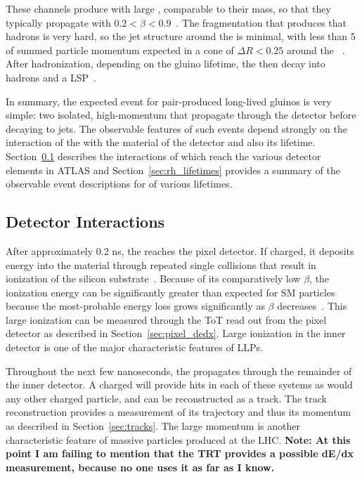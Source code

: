 These channels produce \rhadrons with large \pt, comparable to their mass, so that they typically propagate with $0.2 < \beta < 0.9$~\cite{rhad_atlas}.
The fragmentation that produces that hadrons is very hard, so the jet structure around the \rhadron is minimal, with less than 5 \GeV of summed particle momentum expected in a cone of $\Delta R < 0.25$ around the \rhadron~\cite{rhad_atlas}.
After hadronization, depending on the gluino lifetime, the \rhadrons then decay into hadrons and a \ac{LSP}~\cite{rhadron}.

In summary, the expected event for pair-produced long-lived gluinos is very simple: two isolated, high-momentum \rhadrons that propagate through the detector before decaying to jets.
The observable features of such events depend strongly on the interaction of the \rhadron with the material of the detector and also its lifetime.
Section~\ref{sec:rh_interactions} describes the interactions of \rhadrons which reach the various detector elements in \ac{ATLAS} and Section~\ref{sec:rh_lifetimes} provides a summary of the observable event descriptions for \rhadrons of various lifetimes.

\subsection{Detector Interactions}
\label{sec:rh_interactions}

After approximately 0.2 ns, the \rhadron reaches the pixel detector. If charged, it deposits energy into the material through repeated single collisions that result in ionization of the silicon substrate~\cite{pdg}. 
Because of its comparatively low $\beta$, the ionization energy can be significantly greater than expected for \ac{SM} particles because the most-probable energy loss grows significantly as $\beta$ decreases~\cite{pdg}.
This large ionization can be measured through the \ac{ToT} read out from the pixel detector as described in Section~\ref{sec:pixel_dedx}.
Large ionization in the inner detector is one of the major characteristic features of \acp{LLP}.

Throughout the next few nanoseconds, the \rhadron propagates through the remainder of the inner detector.
A charged \rhadron will provide hits in each of these systems as would any other charged particle, and can be reconstructed as a track.
The track reconstruction provides a measurement of its trajectory and thus its momentum as described in Section~\ref{sec:tracks}.
The large momentum is another characteristic feature of massive particles produced at the \ac{LHC}.
\textbf{Note: At this point I am failing to mention that the TRT provides a possible dE/dx measurement, because no one uses it as far as I know.}

